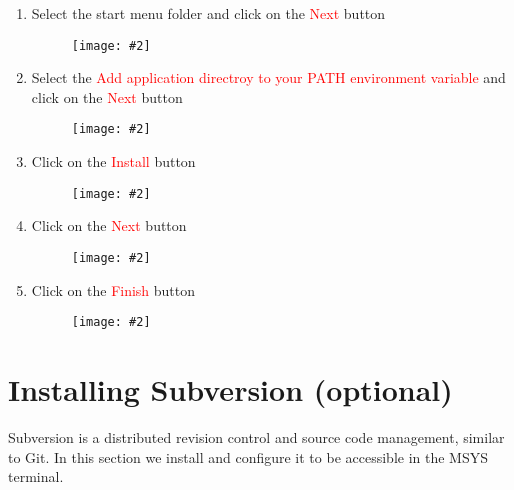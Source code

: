 \documentclass[a4paper]{article}
\newcommand{\FIG}[2]
{
	\begin{figure}[ht!]
	\centering
	\texttt{[image: \#2]}
	\end{figure}
}
\newcommand{\FIGUREB}[1]{\FIG{0.26}{#1}}
\newcommand{\RED}[1] {\textcolor{red}{#1}}
\begin{document}
\begin{enumerate}
\clearpage

\item Select the start menu folder and click on the \RED{Next} button
\FIGUREB{GNUPlot-12.png}

\item Select the
\RED{Add application directroy to your PATH environment variable} and click on
the \RED{Next} button
\FIGUREB{GNUPlot-13.png}

\clearpage

\item Click on the \RED{Install} button
\FIGUREB{GNUPlot-14.png}

\item Click on the \RED{Next} button
\FIGUREB{GNUPlot-15.png}

\clearpage

\item Click on the \RED{Finish} button
\FIGUREB{GNUPlot-16.png}

\end{enumerate}

\clearpage

\section{Installing Subversion (optional)}

Subversion is a distributed revision control and source code management, similar
to Git. In this section we install and configure it to be accessible in the MSYS
terminal.
\end{document}
